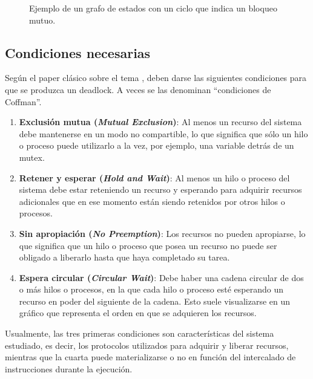 \begin{figure}[!htb]
      \centering
      
      \caption{Ejemplo de un grafo de estados con un ciclo que indica un bloqueo mutuo.}
      \label{fig:state-graph-example}
\end{figure}
\subsection{Condiciones necesarias}
\label{sec:coffman-conditions}

Según el paper clásico sobre el tema \cite{coffman1971deadlocks}, deben darse las siguientes
condiciones para que se produzca un deadlock.
A veces se las denominan ``condiciones de Coffman''.

\begin{enumerate}
      \item \textbf{Exclusión mutua (\textit{Mutual Exclusion})}:
            Al menos un recurso del sistema debe mantenerse en un modo no
            compartible, lo que significa que sólo un hilo o proceso puede utilizarlo a la vez, por
            ejemplo, una variable detrás de un mutex.
      \item \textbf{Retener y esperar (\textit{Hold and Wait})}:
            Al menos un hilo o proceso del sistema debe estar reteniendo un
            recurso y esperando para adquirir recursos adicionales que en ese momento están siendo
            retenidos por otros hilos o procesos.
      \item \textbf{Sin apropiación (\textit{No Preemption})}:
            Los recursos no pueden apropiarse, lo que significa que un hilo o proceso
            que posea un recurso no puede ser obligado a liberarlo hasta que haya completado su
            tarea.
      \item \textbf{Espera circular (\textit{Circular Wait})}:
            Debe haber una cadena circular de dos o más hilos o procesos, en la
            que cada hilo o proceso esté esperando un recurso en poder del siguiente de la cadena.
            Esto suele visualizarse en un gráfico que representa el orden en que se adquieren los
            recursos.
\end{enumerate}

Usualmente, las tres primeras condiciones son características del sistema estudiado, es decir,
los protocolos utilizados para adquirir y liberar recursos, mientras que la cuarta puede
materializarse o no en función del intercalado de instrucciones durante la ejecución.

